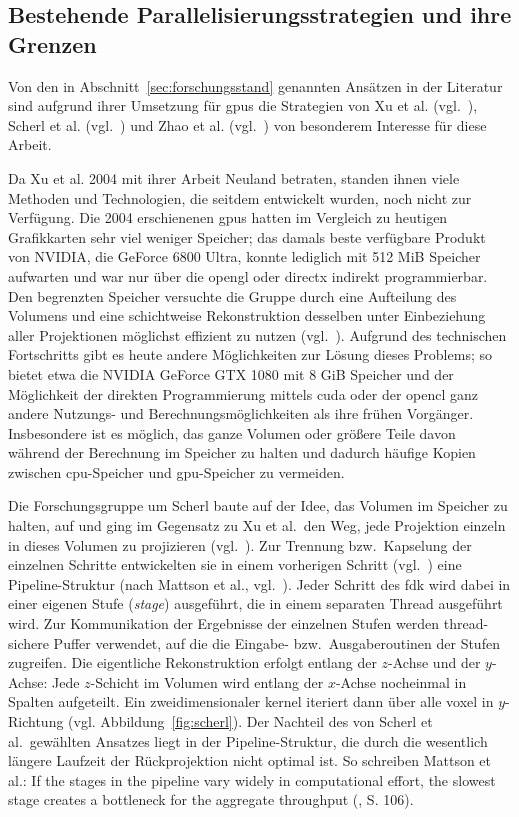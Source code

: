 \subsection{Bestehende Parallelisierungsstrategien und ihre Grenzen}\label{ssec:par_strat}

Von den in Abschnitt~\ref{sec:forschungsstand} genannten Ansätzen in der Literatur sind aufgrund ihrer Umsetzung für
\gls{gpu}s die Strategien von Xu et al. (vgl.~\cite{xumuell}), Scherl et al. (vgl.~\cite{scherlkeck}) und Zhao et al.
(vgl.~\cite{zhao}) von besonderem Interesse für diese Arbeit.

Da Xu et al. 2004 mit ihrer Arbeit Neuland betraten, standen ihnen viele Methoden und Technologien, die seitdem 
entwickelt wurden, noch nicht zur Verfügung. Die 2004 erschienenen \gls{gpu}s hatten im Vergleich zu heutigen
Grafikkarten sehr viel weniger Speicher; das damals beste verfügbare Produkt von NVIDIA, die GeForce 6800 Ultra, konnte
lediglich mit 512 MiB Speicher aufwarten und war nur über die \gls{opengl} oder \gls{directx} indirekt programmierbar.
Den begrenzten Speicher versuchte die Gruppe durch eine Aufteilung des Volumens und eine schichtweise Rekonstruktion
desselben unter Einbeziehung aller Projektionen möglichst effizient zu nutzen (vgl.~\cite{xumuell}). Aufgrund des
technischen Fortschritts gibt es heute andere Möglichkeiten zur Lösung dieses Problems; so bietet etwa die NVIDIA
GeForce GTX 1080 mit 8 GiB Speicher und der Möglichkeit der direkten Programmierung mittels \gls{cuda} oder
der \gls{opencl} ganz andere Nutzungs- und Berechnungsmöglichkeiten als ihre frühen Vorgänger. Insbesondere ist es
möglich, das ganze Volumen oder größere Teile davon während der Berechnung im Speicher zu halten und dadurch häufige
Kopien zwischen \gls{cpu}-Speicher und \gls{gpu}-Speicher zu vermeiden.

Die Forschungsgruppe um Scherl baute auf der Idee, das Volumen im Speicher zu halten, auf und ging im Gegensatz zu Xu et
al.\ den Weg, jede Projektion einzeln in dieses Volumen zu projizieren (vgl.~\cite{scherlkeck}). Zur Trennung bzw.\
Kapselung der einzelnen Schritte entwickelten sie in einem vorherigen Schritt (vgl.~\cite{scherlhopp}) eine
Pipeline-Struktur (nach Mattson et al., vgl.~\cite{mattsan}). Jeder Schritt des \gls{fdk} wird dabei in einer eigenen
Stufe (\textit{stage}) ausgeführt, die in einem separaten Thread ausgeführt wird. Zur Kommunikation der Ergebnisse der
einzelnen Stufen werden thread-sichere Puffer verwendet, auf die die Eingabe- bzw.\ Ausgaberoutinen der Stufen
zugreifen. Die eigentliche Rekonstruktion erfolgt entlang der $z$-Achse und der $y$-Achse: Jede $z$-Schicht im Volumen
wird entlang der $x$-Achse nocheinmal in Spalten aufgeteilt. Ein zweidimensionaler \gls{kernel} iteriert dann über alle
\gls{voxel} in $y$-Richtung (vgl. Abbildung~\ref{fig:scherl}). Der Nachteil des von Scherl et al.\ gewählten Ansatzes
liegt in der Pipeline-Struktur, die durch die wesentlich längere Laufzeit der Rückprojektion nicht optimal ist. So
schreiben Mattson et al.: {\glqq}If the stages in the pipeline vary widely in computational effort, the slowest stage
creates a bottleneck for the aggregate throughput{\grqq} (\cite{mattsan}, S. 106).

